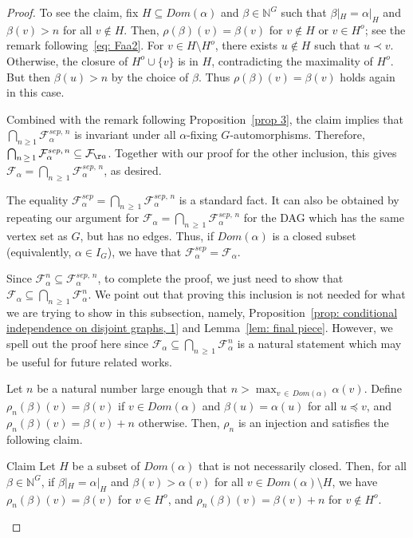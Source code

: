 \documentclass[AHL,Unicode,longabstracts,published]{cedram}
\newcommand{\alf}{\alpha}%
\newcommand*\bb{\beta}
\newcommand*{\sep}{\mathit{sep}}
\newcommand{\indices}[1]{\mathbb{N}^{#1}}
\newcommand*\dom{\mathit{Dom}}
\newcommand*\N{\mathbb{N}}
\newcommand*\FF{\mathcal{F}}
\newcommand*\N{\mathbb{N}}
\begin{document}
\begin{proof}
To see the claim, fix $H \subseteq \dom(\alf)$ and $\bb \in \N^G$ such that $\bb|_H=\alf|_H$ and $\bb(v)>n$ for all $v \not\in H$. Then, $\rho(\bb)(v)=\bb(v)$ for $v \not\in H$ or $v \in H^o$; see the remark following~\eqref{eq: Faa2}. For $v \in H\setminus H^o$, there exists $u \notin H$ such that $u \prec v$. Otherwise, the closure of $H^o \cup \{v\}$ is in $H$, contradicting the maximality of $H^o$. But then $\bb(u) > n$ by the choice of $\bb$. Thus $\rho(\bb)(v)=\bb(v)$ holds again in this case.

Combined with the remark following Proposition~\ref{prop 3}, the claim implies that $\bigcap_{n \geq 1} \mathcal{F}^{\sep,\,n}_\alf$ is invariant under all $\alf$-fixing $G$-automorphisms. Therefore, $\bigcap_{n \,\geq\,1} \mathcal{F}^{\sep,\,n}_\alf\linebreak\subseteq \FF_{å}$. Together with our proof for the other inclusion, this gives $\FF_\alf = \bigcap_{n\,\geq\,1} \mathcal{F}^{\sep,\,n}_\alf$, as desired.

The equality $\FF_\alf^{\sep}=\bigcap_{n\,\geq\,1} \mathcal{F}^{\sep,\,n}_\alf$ is a standard fact. It can also be obtained by repeating our argument for $\FF_\alf =\bigcap_{n\,\geq\,1} \mathcal{F}^{\sep,\,n}_\alf$ {for the DAG which has the same vertex set as $G$, but has no edges}. Thus, if $\dom(\alf)$ is a closed subset (equivalently, $\alf\in I_G$), we have that $\FF_\alf^{\sep}=\FF_\alf $.

Since $\FF_\alf^n \subseteq \mathcal{F}_\alf^{\sep,\,n}$, to complete the proof, we just need to show that $\FF_\alf \subseteq \bigcap_{n\,\geq\,1} \FF_\alf^n $. We point out that proving this inclusion is not needed for what we are trying to show in this subsection, namely, Proposition~\ref{prop: conditional independence on disjoint graphs, 1} and Lemma~\ref{lem: final piece}. However, we spell out the proof here since $\FF_\alf \subseteq \bigcap_{n\,\geq\,1} \FF_\alf^n $ is a natural statement which may be useful for future related works.

Let $n$ be a natural number large enough that $n > \max_{v\,\in\,\dom(\alf)}\alf(v)$. Define $\rho_n(\bb)(v)=\bb(v)$ if $v \in \dom(\alf)$ and $\bb(u)=\alf(u)$ for all $u \preceq v$, and $\rho_n(\bb)(v)=\bb(v)+n$ otherwise. Then, $\rho_n$ is an injection and satisfies the following claim.
\begin{enonce*}[plain]{Claim}
Let $H$ be a subset of $\dom(\alf)$ that is not necessarily closed. Then, for all $\bb \in \indices G$, if $\bb|_H=\alf|_H$ and $\bb(v) > \alf(v)$ for all $v \in \dom(\alf) \setminus H$, we have $\rho_n(\bb)(v)=\bb(v)$ for $v \in H^o$, and $\rho_n(\bb)(v)=\bb(v)+n$ for $v \not\in H^o$.
\end{enonce*}


\end{proof}
\end{document}
